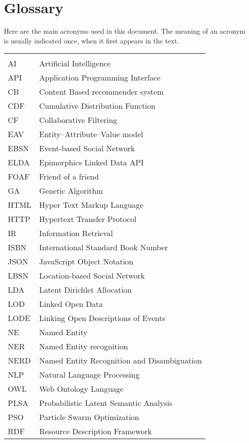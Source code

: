\chapter*{Glossary}

Here are the main acronyms used in this document. The meaning of an acronym is usually indicated once, when it first appears in the text. 

\begin{longtable}{lp{9cm}}
  &\\
  AI & Artificial Intelligence \\
 API  &   Application Programming Interface \\
 CB & Content Based recommender system \\
 CDF & Cumulative Distribution Function \\
 CF & Collaborative Filtering \\
 EAV & Entity–Attribute–Value model \\
 EBSN & Event-based Social Network \\
 ELDA & Epimorphics Linked Data API \\
 FOAF & Friend of a friend \\
 GA & Genetic Algorithm \\
 HTML &   Hyper Text Markup Language\\
 HTTP & Hypertext Transfer Protocol \\
 IR & Information Retrieval \\
 ISBN &   International Standard Book Number\\
 JSON & JavaScript Object Notation \\
 LBSN & Location-based Social Network \\
 LDA & Latent Dirichlet Allocation \\
 LOD & Linked Open Data \\
 LODE & Linking Open Descriptions of Events \\
 NE & Named Entity \\
 NER & Named Entity recognition\\
 NERD & Named Entity Recognition and Disambiguation \\
 NLP & Natural Language Processing \\
 OWL &  Web Ontology Language \\
 PLSA & Probabilistic Latent Semantic Analysis \\
 PSO & Particle Swarm Optimization \\
 RDF  & Resource Description Framework\\

\end{longtable}
